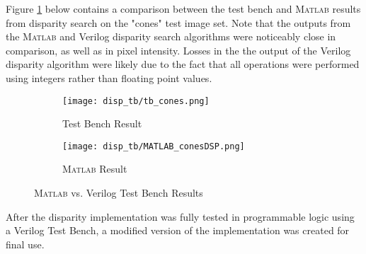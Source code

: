 \par
Figure \ref{disparityVerilogvsMatlab} below contains a comparison between the test bench and \textsc{Matlab} results from disparity search on the "cones" test image set. Note that the outputs from the \textsc{Matlab} and Verilog disparity search algorithms were noticeably close in comparison, as well as in pixel intensity. Losses in the the output of the Verilog disparity algorithm were likely due to the fact that all operations were performed using integers rather than floating point values.
\par
\begin{figure}[H] 
         \begin{subfigure}[h]{0.5\textwidth}
              \centerline{\texttt{[image: disp\_tb/tb\_cones.png]}}
             \caption{Test Bench Result}
         \end{subfigure}
         \begin{subfigure}[h]{0.5\textwidth}
             \centerline{\texttt{[image: disp\_tb/MATLAB\_conesDSP.png]}}
             \caption{\textsc{Matlab} Result}
         \end{subfigure}
\caption{\textsc{Matlab} vs. Verilog Test Bench Results}
\label{disparityVerilogvsMatlab}
\end{figure}
\par
After the disparity implementation was fully tested in programmable logic using a Verilog Test Bench, a modified version of the implementation was created for final use. 

